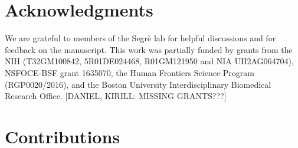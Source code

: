 
\section*{Acknowledgments}

We are grateful to members of the Segrè lab for helpful discussions and for feedback on the manuscript. This work was partially funded by grants from the NIH (T32GM100842, 5R01DE024468, R01GM121950 and NIA UH2AG064704), NSFOCE-BSF grant 1635070, the Human Frontiers Science Program (RGP0020/2016), and the Boston University Interdisciplinary Biomedical Research Office. [DANIEL, KIRILL: MISSING GRANTS???] 

\section*{Contributions}
